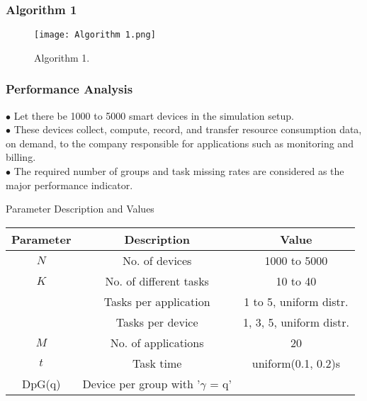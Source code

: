\documentclass{beamer}
\begin{document}
\begin{frame}
\frametitle{Algorithm 1}
\begin{figure}[h]
\centering
\texttt{[image: Algorithm 1.png]}
\caption{Algorithm 1.}
\label{fig:2}
\end{figure}
\end{frame}


\begin{frame}
\frametitle{Performance Analysis}
$\bullet$ Let there be 1000 to 5000 smart devices in the simulation setup.\\
$\bullet$ These devices collect, compute, record, and transfer resource consumption data, on demand, to the company responsible for applications such as monitoring and billing.\\
$\bullet$ The required number of groups and task missing rates are considered as the major performance indicator.\\
\end{frame}
\begin{frame}{Parameter Description and Values}
\begin{table}[h!]
  \begin{center}
    \begin{tabular}{||c|c|c||}
    \hline 
    Parameter &  Description & Value\\
    \hline
    \hline
    $N$ & No. of devices & 1000 to 5000\\
    \hline
    $K$ & No. of different tasks & 10 to 40\\
    \hline
	 & Tasks per application & 1 to 5, uniform distr.\\
	\hline
	 & Tasks per device & 1, 3, 5, uniform distr.\\
	\hline
	$M$ & No. of applications & 20\\
	\hline
	$t$ & Task time & uniform(0.1, 0.2)s\\
	\hline
	DpG(q) & Device per group with '$\gamma$ = q' & \\
	\hline
    \end{tabular}
  \end{center}
  \label{Table:2}
\end{table}

\end{frame}
\end{document}
